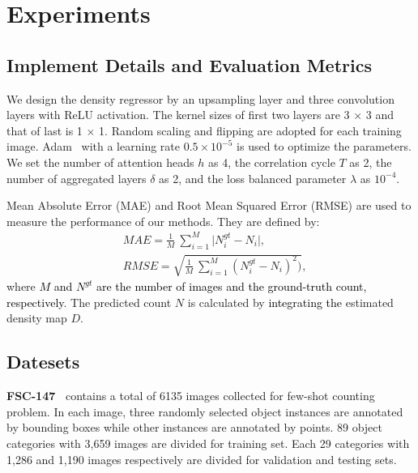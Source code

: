 \documentclass{article}
\newcommand\XP[1]{\textcolor{black}{#1}}%
\begin{document}
\section{Experiments}


\subsection{Implement Details and Evaluation Metrics}
We design the density regressor by an upsampling layer and three convolution layers with ReLU activation. The kernel sizes of first two layers are 3 × 3 and that of last is 1 × 1. Random scaling and flipping are adopt\XP{ed} for each training image. Adam~\cite{kingmaadam} with a learning rate $0.5 \times 10^{-5}$ is used to optimize the parameters. We set the number of attention heads $h$ as 4, the correlation cycle $T$ as 2, the number of aggregated layers $\delta$ as 2, and the loss balanced parameter $\lambda$ as $10^{-4}$.

Mean Absolute Error (MAE) and Root Mean Squared Error (RMSE) are used to measure the performance of our methods. They are defined by: 
\begin{equation}
\begin{aligned}
    &MAE=\frac{1}{M}\ \sum_{i=1}^{M}\big|N_i^{gt}-N_i\big|,\\ &RMSE=\sqrt{\frac{1}{M}\ \sum_{i=1}^{M}(N_i^{gt}-N_i)^2)},
\end{aligned}
\end{equation}
where \XP{$M$ and $N^{gt}$ are the number of images and the ground-truth count, respectively}. The predicted count $N$ is calculated by \XP{integrating the} estimated density map $D$.


\subsection{Datesets}
\noindent \textbf{FSC-147~\cite{ranjan2021learning}} contains a total of 6135 images collected for few-shot counting problem. In each image, three randomly selected object instances are annotated by bounding boxes while other instances are annotated by points. 89 object categories with 3,659 images are divided for training set. Each 29 categories with 1,286 and 1,190 images respectively are divided for validation and testing sets.
\end{document}
